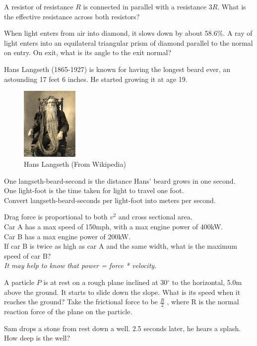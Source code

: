 \documentclass{exam}
\begin{document}
\begin{questions}
    \question[2]
    A resistor of resistance $R$ is connected in parallel with a resistance $3R$. What is the effective resistance across both resistors?

    \question[2]
    When light enters from air into diamond, it slows down by about 58.6\%. 
    A ray of light enters into an equilateral triangular prism of diamond parallel to the normal on entry. On exit, what is its angle to the exit normal?

    \question[4]
    Hans Langseth (1865-1927) is known for having the longest beard ever, an astounding 17 feet 6 inches. He started growing it at age 19.\\
    \begin{figure}[h]
        \centering
        \includegraphics[height=100pt]{hanslangseth}
        \caption{Hans Langseth (From Wikipedia)}
    \end{figure}
    One langseth-beard-second is the distance Hans' beard grows in one second.\\
    One light-foot is the time taken for light to travel one foot.\\
    Convert langseth-beard-seconds per light-foot into meters per second.

    \question[4]
    Drag force is proportional to both $v^2$ and cross sectional area.\\
    Car A has a max speed of 150mph, with a max engine power of 400kW.\\
    Car B has a max engine power of 200kW.\\
    If car B is twice as high as car A and the same width, what is the maximum speed of car B?\\
    \textit{It may help to know that power = force * velocity.}

    \question[4]
    A particle $P$ is at rest on a rough plane inclined at 30$^\circ$ to the horizontal, 5.0m above the ground. It starts to slide down the slope. What is its speed when it reaches the ground?
    Take the frictional force to be $\frac{R}{2}$ , where R is the normal reaction force of the plane on the particle.

    \question[4]
    Sam drops a stone from rest down a well. 2.5 seconds later, he hears a splash. How deep is the well?

\end{questions}
\end{document}
